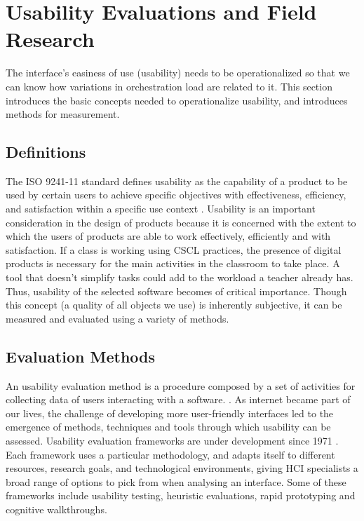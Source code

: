 \section{Usability Evaluations and Field Research}
The interface's easiness of use (usability) needs to be operationalized so that we can know how variations in orchestration load are related to it. This section introduces the basic concepts needed to operationalize usability, and introduces methods for measurement.
\subsection{Definitions}
The ISO 9241-11 standard defines usability as the capability of a product to be used by certain users to achieve specific objectives with effectiveness, efficiency, and satisfaction within a specific use context \cite{noauthor_undated-ex}. Usability is an important consideration in the design of products because it is concerned with the extent to which the users of products are able to work effectively, efficiently and with satisfaction. If a class is working using CSCL practices, the presence of digital products is necessary for the main activities in the classroom to take place. A tool that doesn't simplify tasks could add to the workload a teacher already has. Thus, usability of the selected software becomes of critical importance. Though this concept (a quality of all objects we use) is inherently subjective, it can be measured and evaluated using a variety of methods.
\subsection{Evaluation Methods}
An usability evaluation method is a procedure composed by a set of activities for collecting data of users interacting with a software. \cite{Fernandez2011-ln}. As internet became part of our lives, the challenge of developing more user-friendly interfaces led to the emergence of methods, techniques and tools through which usability can be assessed.
Usability evaluation frameworks are under development since 1971 \cite{Scholtz_undated-ip}. Each framework uses a particular methodology, and adapts itself to different resources, research goals, and technological environments, giving HCI specialists a broad range of options to pick from when analysing an interface. Some of these frameworks include usability testing, heuristic evaluations, rapid prototyping and cognitive walkthroughs.
